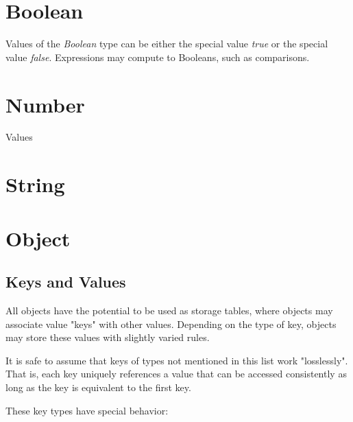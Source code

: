 \documentclass[12pt,letterpaper]{report}
\begin{document}



\section{Boolean}\label{Boolean}

Values of the \textit{Boolean} type can be either the special value \textit{true} or 
the special value \textit{false}. Expressions may compute to Booleans, such 
as comparisons.





\section{Number}\label{Number}



Values
\section{String}\label{String}
\section{Object}\label{Object}
\subsection{Keys and Values}\label{Keys and Values}

All objects have the potential to be used as storage tables, where objects may associate 
value "keys" with other values. Depending on the type of key, objects may store these values 
with slightly varied rules. 

It is safe to assume that keys of types not mentioned in this list work "losslessly". That is, 
each key uniquely references a value that can be accessed consistently as long as the 
key is equivalent to the first key.

These key types have special behavior:
\end{document}
